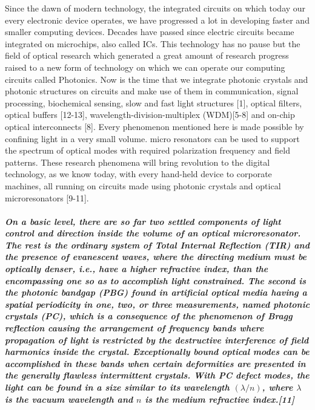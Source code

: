 \normalfont \large Since the dawn of modern technology, the integrated circuits on which today our every electronic device operates, we have progressed a lot in developing faster and smaller computing devices. Decades have passed since electric circuits became integrated on microchips, also called ICs. This technology has no pause but the field of optical research which generated a great amount of research progress raised to a new form of technology on which we can operate our computing circuits called Photonics. Now is the time that we integrate photonic crystals and photonic structures on circuits and make use of them in communication, signal processing, biochemical sensing, slow and fast light structures [1], optical filters, optical buffers [12-13], wavelength-division-multiplex (WDM)[5-8] and on-chip optical interconnects [8]. Every phenomenon mentioned here is made possible by confining light in a very small volume. micro resonators can be used to support the spectrum of optical modes with required polarization frequency and field patterns. These research phenomena will bring revolution to the digital technology, as we know today, with every hand-held device to corporate machines, all running on circuits made using photonic crystals and optical microresonators [9-11]. 
\subparagraph{\normalfont \large On a basic level, there are so far two settled components of light control and direction inside the volume of an optical microresonator. The rest is the ordinary system of Total Internal Reflection (TIR) and the presence of evanescent waves, where the directing medium must be optically denser, i.e., have a higher refractive index, than the encompassing one so as to accomplish light constrained. The second is the photonic bandgap (PBG) found in artificial optical media having a spatial periodicity in one, two, or three measurements, named photonic crystals (PC), which is a consequence of the phenomenon of Bragg reflection causing the arrangement of frequency bands where propagation of light is restricted by the destructive interference of field harmonics inside the crystal. Exceptionally bound optical modes can be accomplished in these bands when certain deformities are presented in the generally flawless intermittent crystals. With PC defect modes, the light can be found in a size similar to its wavelength $(\lambda/n)$, where $\lambda$ is the vacuum wavelength and $n$ is the medium refractive index.[11]}

